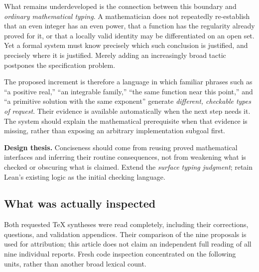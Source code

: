 \documentclass[11pt,a4paper]{article}
\newcommand{\code}[1]{\texttt{\detokenize{#1}}}
\theoremstyle{plain}\newtheorem{proposition}{Proposition}[section]
\theoremstyle{definition}\newtheorem{definition}[proposition]{Definition}
\theoremstyle{remark}\newtheorem{remark}[proposition]{Remark}
\begin{document}
What remains underdeveloped is the connection between this boundary and \emph{ordinary mathematical typing}. A mathematician does not repeatedly re-establish that an even integer has an even power, that a function has the regularity already proved for it, or that a locally valid identity may be differentiated on an open set. Yet a formal system must know precisely which such conclusion is justified, and precisely where it is justified. Merely adding an increasingly broad \code{obvious} tactic postpones the specification problem.

The proposed increment is therefore a language in which familiar phrases such as ``a positive real,'' ``an integrable family,'' ``the same function near this point,'' and ``a primitive solution with the same exponent'' generate \emph{different, checkable types of request}. Their evidence is available automatically when the next step needs it. The system should explain the mathematical prerequisite when that evidence is missing, rather than exposing an arbitrary implementation subgoal first.

\begin{claimbox}
\textbf{Design thesis.} Conciseness should come from reusing proved mathematical interfaces and inferring their routine consequences, not from weakening what is checked or obscuring what is claimed. Extend the \emph{surface typing judgment}; retain Lean's existing logic as the initial checking language.
\end{claimbox}

\subsection{What was actually inspected}
Both requested TeX syntheses were read completely, including their corrections, questions, and validation appendices. Their comparison of the nine proposals is used for attribution; this article does not claim an independent full reading of all nine individual reports. Fresh code inspection concentrated on the following units, rather than another broad lexical count.
\end{document}
